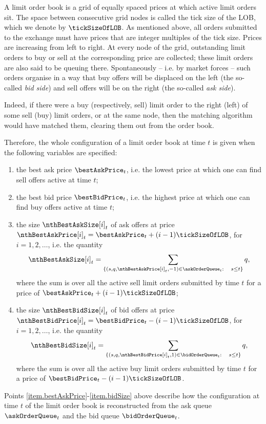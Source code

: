 A limit order book is a grid of equally spaced prices at which active limit orders sit.
The space between consecutive grid nodes is called the tick size of the LOB,
which we denote by $\tickSizeOfLOB$.
As mentioned above,
all orders submitted to the exchange must have prices that are integer multiples of the tick size.
Prices are increasing from left to right.
At every node of the grid,
outstanding limit orders to buy or sell at the corresponding price are collected;
these limit orders are also said to be queuing there.
Spontaneously -- i.e.
by market forces -- such orders organise in a way that
buy offers will be displaced on the left (the so-called \emph{bid side})
and sell offers will be on the right (the so-called \emph{ask side}).

Indeed,
if there were a buy (respectively, sell) limit order to the right (left) of some sell (buy) limit orders,
or at the same node,
then the matching algorithm would have matched them, clearing them out from the order book.

Therefore, the whole configuration of a limit order book at time $t$ is given
when the following variables are specified:
\begin{enumerate}[label={\emph{\roman{*}}.}, ref={\emph{\roman{*}}.}]
\item\label{item.bestAskPrice} the best ask price $\bestAskPrice_{t}$, i.e.
the lowest price at which one can find sell offers active at time $t$;
\item\label{item.bestBidPrice} the best bid price $\bestBidPrice_t$, i.e.
the highest price at which one can find buy offers active at time $t$;
\item\label{item.askSize} the size $\nthBestAskSize[i]_t$ of ask offers at price
$\nthBestAskPrice[i]_t= \bestAskPrice_t + (i-1)\tickSizeOfLOB$, for $i=1,2,\dots$, i.e.
the quantity
\begin{equation*}
 \nthBestAskSize[i]_t = \sum_{\lbrace(s,q,\nthBestAskPrice[i]_t,-1) \in \askOrderQueue_t : \quad s\leq t\rbrace} q,
\end{equation*}
where the sum is over all the active sell limit orders submitted by time $t$
for a price of $\bestAskPrice_t + (i-1)\tickSizeOfLOB$;
\item\label{item.bidSize} the size $\nthBestBidSize[i]_t$ of bid offers at price
$\nthBestBidPrice[i]_t=\bestBidPrice_t - (i-1)\tickSizeOfLOB$, for $i=1,2,\dots$, i.e.
the quantity
\begin{equation*}
 \nthBestBidSize[i]_t = \sum_{\lbrace (s,q,\nthBestBidPrice[i]_t,1) \in \bidOrderQueue_t: \quad s\leq t\rbrace} q,
\end{equation*}
where the sum is over all the active buy limit orders submitted by time $t$
for a price of $\bestBidPrice_t - (i-1)\tickSizeOfLOB$.
\end{enumerate}
Points \ref{item.bestAskPrice}-\ref{item.bidSize} above describe how the configuration at time $t$
of the limit order book is reconstructed from the ask queue $\askOrderQueue_t$
and the bid queue $\bidOrderQueue_t$.


